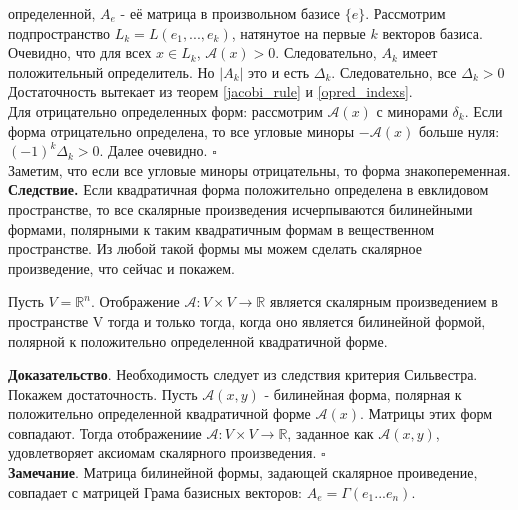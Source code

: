 определенной, $A_e$ - её матрица в произвольном базисе $\{e\}$. Рассмотрим
подпространство $L_k=L(e_1,...,e_k)$, натянутое на первые $k$ векторов базиса.
Очевидно, что для всех  $x\in L_k$, $\mathcal A(x)>0$. Следовательно, $A_k$ 
имеет положительный определитель. Но $|A_k|$ это и есть $\Delta_k$. 
Следовательно, все $\Delta_k>0$ \\
Достаточность вытекает из теорем \ref{jacobi_rule} и \ref{opred_indexs}.\\
Для отрицательно определенных форм: рассмотрим $\mathcal A(x)$ с минорами
$\delta_k$. Если форма отрицательно определена, то все угловые миноры
$-\mathcal A(x)$ больше нуля: $(-1)^k\Delta_k>0$. Далее очевидно. $\square$ \\
Заметим, что если все угловые миноры отрицательны, то форма знакопеременная.\\
\textbf{Следствие.} Если квадратичная форма положительно определена в 
евклидовом пространстве, то все скалярные произведения исчерпываются 
билинейными формами, полярными к таким квадратичным формам в вещественном
пространстве. Из любой такой формы мы можем сделать скалярное произведение,
что сейчас и покажем.
\begin{theor}
Пусть $V=\mathbb R^n$. Отображение $\mathcal A\colon V\times V\to\mathbb R$ 
является скалярным произведением в пространстве V тогда и только тогда, когда
оно является билинейной формой, полярной к положительно определенной
квадратичной форме. 
\end{theor}
\textbf{Доказательство}. Необходимость следует из следствия критерия Сильвестра.
Покажем достаточность. Пусть $\mathcal A(x,y)$ - билинейная форма, полярная 
к положительно определенной квадратичной форме $\mathcal A(x)$. Матрицы этих 
форм совпадают. Тогда отображениие $\mathcal A\colon V\times V\to\mathbb R$, 
заданное как $\mathcal A(x,y)$, удовлетворяет аксиомам скалярного произведения.
$\square$\\
\textbf{Замечание}. Матрица билинейной формы, задающей скалярное проиведение,
совпадает с матрицей Грама базисных векторов: $A_e=\Gamma(e_1...e_n)$.
